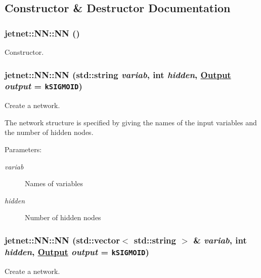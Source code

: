 \subsection{Constructor \& Destructor Documentation}
\hypertarget{classjetnet_1_1NN_a0}{
\subsubsection[NN]{\setlength{\rightskip}{0pt plus 5cm}jetnet::NN::NN ()}}
\label{classjetnet_1_1NN_a0}


Constructor. 

\hypertarget{classjetnet_1_1NN_a1}{
\subsubsection[NN]{\setlength{\rightskip}{0pt plus 5cm}jetnet::NN::NN (std::string {\em variab}, int {\em hidden}, \hyperlink{classjetnet_1_1NN_w18}{Output} {\em output} = {\tt kSIGMOID})}}
\label{classjetnet_1_1NN_a1}


Create a network. 

The network structure is specified by giving the names of the input variables and the number of hidden nodes.\par


\begin{Desc}
\item[Parameters:]
\begin{description}
\item[{\em variab}]Names of variables \item[{\em hidden}]Number of hidden nodes \end{description}
\end{Desc}
\hypertarget{classjetnet_1_1NN_a2}{
\subsubsection[NN]{\setlength{\rightskip}{0pt plus 5cm}jetnet::NN::NN (std::vector$<$ std::string $>$ \& {\em variab}, int {\em hidden}, \hyperlink{classjetnet_1_1NN_w18}{Output} {\em output} = {\tt kSIGMOID})}}
\label{classjetnet_1_1NN_a2}


Create a network. 


